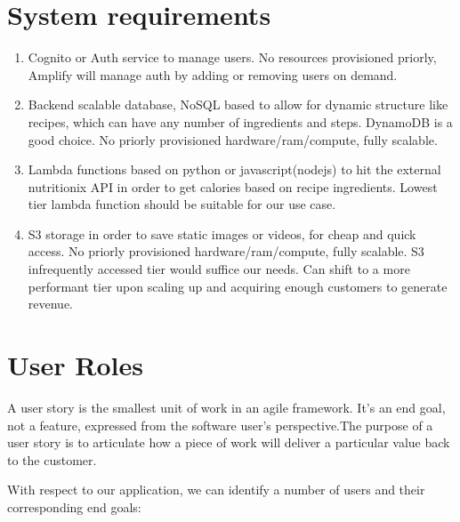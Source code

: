 \section{System requirements}

\begin{enumerate}
  \item Cognito or Auth service to manage users. No resources provisioned priorly, Amplify will manage auth by adding or removing users on demand.
  \item Backend scalable database, NoSQL based to allow for dynamic structure like recipes, which can have any number of ingredients and steps. DynamoDB is a good choice. No priorly provisioned hardware/ram/compute, fully scalable.
  \item Lambda functions based on python or javascript(nodejs) to hit the external nutritionix API in order to get calories based on recipe ingredients. Lowest tier lambda function should be suitable for our use case.
  \item S3 storage in order to save static images or videos, for cheap and quick access. No priorly provisioned hardware/ram/compute, fully scalable. S3 infrequently accessed tier would suffice our needs. Can shift to a more performant tier upon scaling up and acquiring enough customers to generate revenue.
\end{enumerate}

\section{User Roles}

A user story is the smallest unit of work in an agile framework. It’s an end goal, not a feature, expressed from the software user’s perspective.The purpose of a user story is to articulate how a piece of work will deliver a particular value back to the customer.

\smallskip

With respect to our application, we can identify a number of users and their corresponding end goals:

\clearpage

